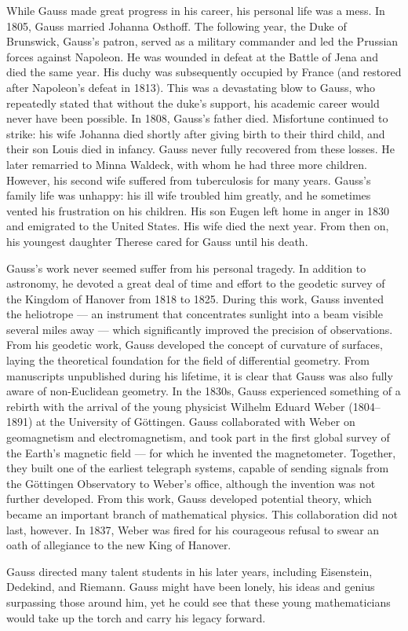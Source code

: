\documentclass[b5paper]{article}
\begin{document}
\begin{mdframed}
While Gauss made great progress in his career, his personal life was a mess. In 1805, Gauss married Johanna Osthoff. The following year, the Duke of Brunswick, Gauss's patron, served as a military commander and led the Prussian forces against Napoleon. He was wounded in defeat at the Battle of Jena and died the same year. His duchy was subsequently occupied by France (and restored after Napoleon's defeat in 1813). This was a devastating blow to Gauss, who repeatedly stated that without the duke's support, his academic career would never have been possible. In 1808, Gauss's father died. Misfortune continued to strike: his wife Johanna died shortly after giving birth to their third child, and their son Louis died in infancy. Gauss never fully recovered from these losses. He later remarried to Minna Waldeck, with whom he had three more children. However, his second wife suffered from tuberculosis for many years. Gauss's family life was unhappy: his ill wife troubled him greatly, and he sometimes vented his frustration on his children. His son Eugen left home in anger in 1830 and emigrated to the United States. His wife died the next year. From then on, his youngest daughter Therese cared for Gauss until his death.

Gauss's work never seemed suffer from his personal tragedy. In addition to astronomy, he devoted a great deal of time and effort to the geodetic survey of the Kingdom of Hanover from 1818 to 1825. During this work, Gauss invented the heliotrope — an instrument that concentrates sunlight into a beam visible several miles away — which significantly improved the precision of observations. From his geodetic work, Gauss developed the concept of curvature of surfaces, laying the theoretical foundation for the field of differential geometry. From manuscripts unpublished during his lifetime, it is clear that Gauss was also fully aware of non-Euclidean geometry. In the 1830s, Gauss experienced something of a rebirth with the arrival of the young physicist Wilhelm Eduard Weber (1804–1891) at the University of Göttingen. Gauss collaborated with Weber on geomagnetism and electromagnetism, and took part in the first global survey of the Earth's magnetic field — for which he invented the magnetometer. Together, they built one of the earliest telegraph systems, capable of sending signals from the Göttingen Observatory to Weber's office, although the invention was not further developed. From this work, Gauss developed potential theory, which became an important branch of mathematical physics. This collaboration did not last, however. In 1837, Weber was fired for his courageous refusal to swear an oath of allegiance to the new King of Hanover.

Gauss directed many talent students in his later years, including Eisenstein, Dedekind, and Riemann. Gauss might have been lonely, his ideas and genius surpassing those around him, yet he could see that these young mathematicians would take up the torch and carry his legacy forward.
\end{mdframed}
\end{document}
